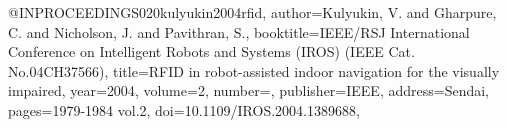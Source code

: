 @INPROCEEDINGS{020kulyukin2004rfid,
author={Kulyukin, V. and Gharpure, C. and Nicholson, J. and Pavithran, S.},
booktitle={IEEE/RSJ International Conference on Intelligent Robots and Systems (IROS) (IEEE Cat. No.04CH37566)}, 
title={RFID in robot-assisted indoor navigation for the visually impaired}, 
year={2004},
volume={2},
number={},
publisher={IEEE},
address={Sendai},
pages={1979-1984 vol.2},
doi={10.1109/IROS.2004.1389688},}
